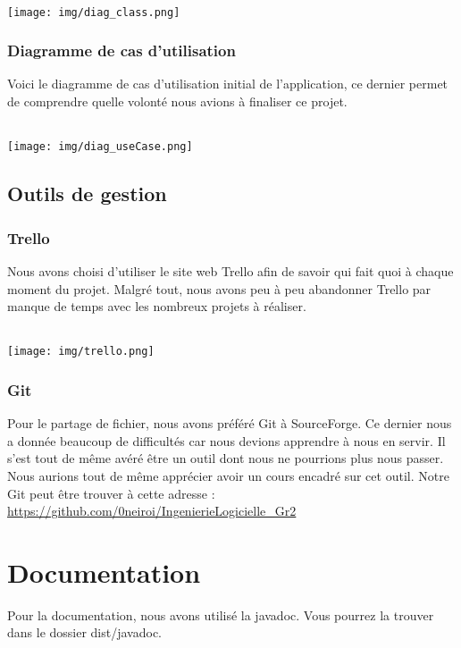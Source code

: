 \documentclass[a4paper,10pt]{report}
\begin{document}
     \paragraph{}
     \texttt{[image: img/diag\_class.png]}
     \newpage
   \section{Diagramme de cas d'utilisation}
     Voici le diagramme de cas d'utilisation initial de l'application, ce dernier permet de comprendre quelle volonté nous avions à finaliser ce projet.
     \paragraph{}
     \texttt{[image: img/diag\_useCase.png]}
 \chapter{Outils de gestion}
   \section{Trello}
     Nous avons choisi d'utiliser le site web Trello afin de savoir qui fait quoi à chaque moment du projet.
     Malgré tout, nous avons peu à peu abandonner Trello par manque de temps avec les nombreux projets à réaliser.
     \paragraph{}
     \texttt{[image: img/trello.png]}
   \section{Git}
     Pour le partage de fichier, nous avons préféré Git à SourceForge. Ce dernier nous a donnée beaucoup de difficultés car nous devions apprendre à nous en servir.
     Il s'est tout de même avéré être un outil dont nous ne pourrions plus nous passer. Nous aurions tout de même apprécier avoir un cours encadré sur cet outil.
     Notre Git peut être trouver à cette adresse : \url{https://github.com/0neiroi/IngenierieLogicielle_Gr2}
\part{Documentation}
 Pour la documentation, nous avons utilisé la javadoc. Vous pourrez la trouver dans le dossier dist/javadoc.
\end{document}
